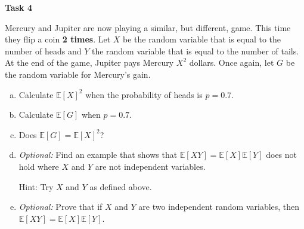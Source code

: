 \documentclass[12pt,letterpaper]{article}
\newenvironment{22enumerate}{\begin{enumerate}[a.]\itemsep0em}{\end{enumerate}}
\newif\ifsol
\newcommand{\solu}[2]{ \begin{mdframed} \ifsol #2 \else \vspace{#1} \fi \end{mdframed} }
\begin{document}
\textbf{Task 4}

Mercury and Jupiter are now playing a similar, but different, game. This time they flip a coin \textbf{2 times}. Let $X$ be the random variable that is equal to the number of heads and $Y$ the random variable that is equal to the number of tails. At the end of the game, Jupiter pays Mercury $X^2$ dollars. Once again, let $G$ be the random variable for Mercury's gain.
\begin{22enumerate}
    \item Calculate $\mathbb{E}[X]^2$ when the probability of  heads is $p = 0.7$.
    \solu{2cm}{$\mathbb{E}[X] = 0.7 + 0.7 = 1.4$. So, $\mathbb{E}[X]^2 = 1.4^2 =1.96
$}
    
    \item Calculate $\mathbb{E}[G]$ when $p = 0.7$.
    \solu{2cm}{$\mathbb{E}[G] =\mathbb{E}[X^2]= (0.7)^2(4) + \binom21 (0.3)(0.7)(1) =2.38
$}
    \item Does $\mathbb{E}[G]=\mathbb{E}[X]^2$? 
    \solu{2cm}{No! 
    
In general for any random variable with nonzero variance we have $\mathbb{E}[X^2]>\mathbb{E}[X])^2$. But you will learn about variance in more advanced courses!}
    
    \item \textit{Optional:} Find an example that shows that $\mathbb{E}[XY] = \mathbb{E}[X]\mathbb{E}[Y]$ does not hold where $X$ and $Y$ are not independent variables.
    
    Hint: Try $X$ and $Y$ as defined above.
    \solu{2cm}{We know that $X$ and $Y$, as defined in this problem, are not independent variables. We know that $\mathbb{E}[X]\mathbb{E}[Y] = 1 \cdot 1 = 1$. We can also calculate $\mathbb{E}[XY]$ to be $(\frac{1}{4})(2)(0) + (\frac{1}{2})(1)(1) = (\frac{1}{4})(0)(2) = \frac{1}{2}$.
    
    Thus, this is an example of where $X$ and $Y$ are dependent variables where $\mathbb{E}[XY] \neq \mathbb{E}[X]\mathbb{E}[Y]$.}
    \item \textit{Optional:} Prove that if $X$ and $Y$ are two independent random variables, then $\mathbb{E}[XY]=\mathbb{E}[X]\mathbb{E}[Y]$.
    \solu{2cm}{
    Assume $X$ and $Y$
 are independent. So for any $x$ and $y$ in their range we have $\Pr(X=x \wedge Y=y)=\Pr(X=x) \Pr(Y=y)$. We now use the definition of expected value. \begin{align}\mathbb{E}[XY]&=\sum_{x\in X(S)}\sum_{y\in Y(S)}xy \Pr(X=x\wedge Y=y)\\
 &
 =\sum_{x\in X(S)}\sum_{y\in Y(S)}xy \Pr(X=x)\Pr( Y=y)\\
 &=\left(\sum_{x\in X(S)}x\Pr( X=x)\right)\left(\sum_{y\in Y(S)}y\Pr( Y=y)\right) \\
 &=\mathbb{E}[X]\mathbb{E}[Y]\end{align}  
}
\end{22enumerate}
\end{document}

